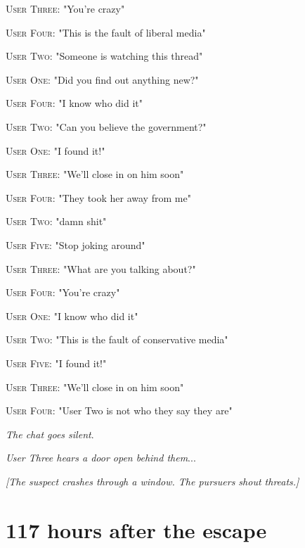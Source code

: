 \documentclass{report}
\begin{document}
\textsc{User Three}: "You're crazy" 

\textsc{User Four}: "This is the fault of liberal media" 

\textsc{User Two}: "Someone is watching this thread" 

\textsc{User One}: "Did you find out anything new?" 

\textsc{User Four}: "I know who did it" 

\textsc{User Two}: "Can you believe the government?" 

\textsc{User One}: "I found it!" 

\textsc{User Three}: "We'll close in on him soon" 

\textsc{User Four}: "They took her away from me" 

\textsc{User Two}: "damn shit" 

\textsc{User Five}: "Stop joking around" 

\textsc{User Three}: "What are you talking about?" 

\textsc{User Four}: "You're crazy" 

\textsc{User One}: "I know who did it" 

\textsc{User Two}: "This is the fault of conservative media" 

\textsc{User Five}: "I found it!" 

\textsc{User Three}: "We'll close in on him soon" 

\textsc{User Four}: "User Two is not who they say they are" 

\textit{The chat goes silent}. 

\textit{User Three hears a door open behind them}...

\textit{[The suspect crashes through a window. The pursuers shout threats.]}


\section*{117 \small{hours after the escape}}
\end{document}
